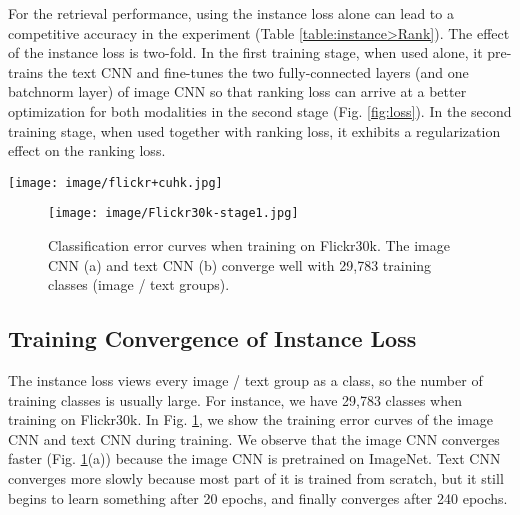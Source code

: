 \documentclass[10pt,final,journal]{IEEEtran}
\begin{document}
For the retrieval performance, using the instance loss alone can lead to a competitive accuracy in the experiment (Table \ref{table:instance>Rank}). The effect of the instance loss is two-fold. In the first training stage, when used alone, it pre-trains the  text CNN and fine-tunes the two fully-connected layers (and one batchnorm layer) of image CNN so that ranking loss can arrive at a better optimization for both modalities in the second stage (Fig. \ref{fig:loss}). In the second training stage, when used together with ranking loss, it exhibits a regularization effect on the ranking loss. 
\begin{figure*}[t]
\begin{center}
   \texttt{[image: image/flickr+cuhk.jpg]}
\end{center}
   \caption{Sample images in the three datasets. For the MSCOCO and Flickr30k datasets, we view every image and its captions as an image / text group. For CUHK-PEDES, we view every identity (with several images and captions) as a class. }
\label{fig:6}
\end{figure*}

\begin{figure}[t]
\begin{center}
   \texttt{[image: image/Flickr30k-stage1.jpg]}
\end{center}
   \caption{Classification error curves when training on Flickr30k. The image CNN (a) and text CNN (b) converge well with 29,783 training classes (image / text groups).}
\label{fig:converge}
\end{figure}

\subsection{Training Convergence of Instance Loss}\label{sec:convergence}
The instance loss views every image / text group as a class, so the number of training classes is usually large. For instance, we have 29,783 classes when training on Flickr30k. In Fig. \ref{fig:converge}, we show the training error curves of the image CNN and text CNN during training. 
We observe that the image CNN converges faster (Fig. \ref{fig:converge}(a)) because the image CNN is pretrained on ImageNet. Text CNN converges more slowly because most part of it is trained from scratch, but it still begins to learn something after 20 epochs, and finally converges after 240 epochs. 
\end{document}
